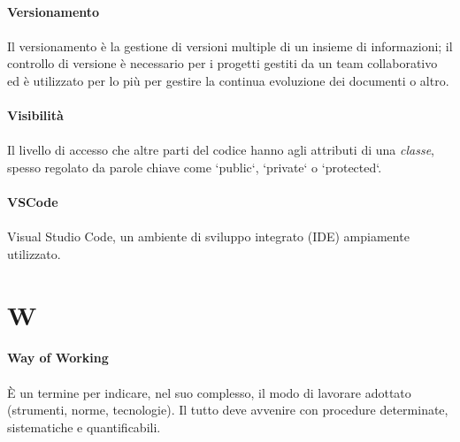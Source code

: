 \documentclass[10pt, a4paper]{article}
\begin{document}
\vspace{2em}
\paragraph{Versionamento}\noindent\hrulefill
\paragraph{}Il versionamento è la gestione di versioni multiple di un insieme di informazioni; il controllo di versione è necessario
per i progetti gestiti da un team collaborativo ed è utilizzato per lo più per gestire la continua evoluzione dei documenti o altro.

\vspace{2em}
\paragraph{Visibilità}\noindent\hrulefill
\paragraph{}Il livello di accesso che altre parti del codice hanno agli attributi di una \textit{classe\pg}, spesso regolato da parole chiave come `public`, `private` o `protected`.

\vspace{2em}
\paragraph{VSCode}\noindent\hrulefill
\paragraph{}Visual Studio Code, un ambiente di sviluppo integrato (IDE) ampiamente utilizzato.


\newpage
\section{W}

\vspace{2em}
\paragraph{Way of Working}\noindent\hrulefill
\paragraph{}È un termine per indicare, nel suo complesso, il modo di lavorare adottato (strumenti, norme, tecnologie). Il tutto deve avvenire con procedure determinate, sistematiche e quantificabili.   
\end{document}
